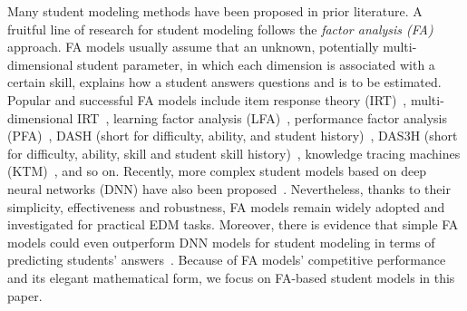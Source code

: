 \documentclass{edm_article}
\begin{document}
\sloppy
Many student modeling methods have been proposed in prior literature. A fruitful line of research for student modeling follows the \textit{factor analysis (FA)} approach.
FA models usually assume that an unknown, potentially multi-dimensional student parameter, in which each dimension is associated with a certain skill, explains how a student answers questions and is to be estimated. Popular and successful FA models include item response theory (IRT)~\cite{irt}, multi-dimensional IRT~\cite{mirt}, learning factor analysis (LFA)~\cite{LFA}, performance factor analysis (PFA)~\cite{PFA}, DASH (short for {d}ifficulty, {a}bility, and {s}tudent {h}istory)~\cite{lindsey2014improving,mozer2016predicting}, DAS3H (short for {d}ifficulty, {a}bility, {s}kill and {s}tudent {s}kill {h}istory)~\cite{das3h}, knowledge tracing machines (KTM)~\cite{vie2019knowledge}, and so on. 
Recently, more complex student models based on deep neural networks (DNN) have also been proposed~\cite{DKT,zhang2017dynamic,minn2018deep}. Nevertheless, thanks to their simplicity, effectiveness and robustness, FA models remain widely adopted and investigated for practical EDM tasks. Moreover, there is evidence that simple FA models could even outperform DNN models for student modeling in terms of predicting students' answers~\cite{irt-best}. Because of FA models' competitive performance and its elegant mathematical form, we focus on FA-based student models in this paper.
\end{document}
